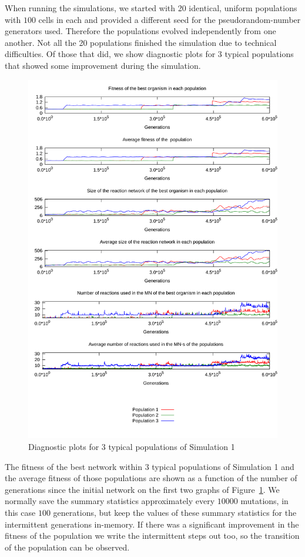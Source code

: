 \documentclass[a4paper,12pt]{article}
\begin{document}
When running the simulations, we started with 20 identical, uniform populations with $100$ cells in each and provided a different seed for the pseudorandom-number generators used. Therefore the populations evolved independently from one another. Not all the 20 populations finished the simulation due to technical difficulties. Of those that did, we show diagnostic plots for 3 typical populations that showed some improvement during the simulation.




\begin{figure}[htpb]
	\centering
	\includegraphics[width=0.8\linewidth]{simulation1.pdf}
	\caption{Diagnostic plots for 3 typical populations of Simulation 1}
	\label{fig:simulation1}
\end{figure}


The fitness of the best network within $3$ typical populations of Simulation 1 and the average fitness of those populations are shown as a function of the number of generations since the initial network on the first two graphs of Figure~\ref{fig:simulation1}. We normally save the summary statistics approximately every $10000$ mutations, in this case $100$ generations, but keep the values of these summary statistics for the intermittent generations in-memory. If there was a significant improvement in the fitness of the population we write the intermittent steps out too, so the transition of the population can be observed. 
\end{document}
